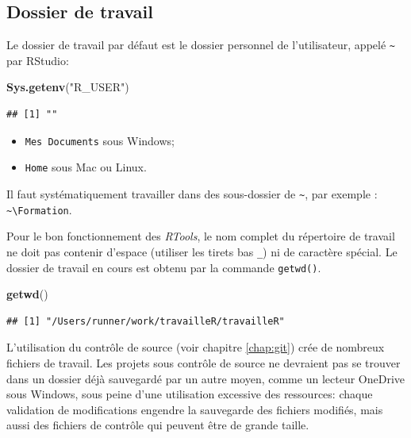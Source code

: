 \documentclass[
  12pt,
  french,
  a4paper,
  extrafontsizes,onecolumn,openright
  ]{memoir}
\newenvironment{Shaded}{\begin{snugshade}}{\end{snugshade}}
\newcommand{\KeywordTok}[1]{\textcolor[rgb]{0.13,0.29,0.53}{\textbf{#1}}}
\newcommand{\NormalTok}[1]{#1}
\newcommand{\StringTok}[1]{\textcolor[rgb]{0.31,0.60,0.02}{#1}}
\providecommand{\tightlist}{%
  \setlength{\itemsep}{0pt}\setlength{\parskip}{0pt}}
\begin{document}
\hypertarget{dossier-de-travail}{%
\subsection{Dossier de travail}\label{dossier-de-travail}}

Le dossier de travail par défaut est le dossier personnel de l'utilisateur, appelé \texttt{\textasciitilde{}} par RStudio:

\scriptsize

\begin{Shaded}
\begin{Highlighting}[]
\KeywordTok{Sys.getenv}\NormalTok{(}\StringTok{"R_USER"}\NormalTok{)}
\end{Highlighting}
\end{Shaded}

\begin{verbatim}
## [1] ""
\end{verbatim}

\normalsize

\begin{itemize}
\tightlist
\item
  \texttt{Mes\ Documents} sous Windows;
\item
  \texttt{Home} sous Mac ou Linux.
\end{itemize}

Il faut systématiquement travailler dans des sous-dossier de \texttt{\textasciitilde{}}, par exemple : \texttt{\textasciitilde{}\textbackslash{}Formation}.

Pour le bon fonctionnement des \emph{RTools}, le nom complet du répertoire de travail ne doit pas contenir d'espace (utiliser les tirets bas \texttt{\_}) ni de caractère spécial.
Le dossier de travail en cours est obtenu par la commande \texttt{getwd()}.

\scriptsize

\begin{Shaded}
\begin{Highlighting}[]
\KeywordTok{getwd}\NormalTok{()}
\end{Highlighting}
\end{Shaded}

\begin{verbatim}
## [1] "/Users/runner/work/travailleR/travailleR"
\end{verbatim}

\normalsize

L'utilisation du contrôle de source (voir chapitre \ref{chap:git}) crée de nombreux fichiers de travail.
Les projets sous contrôle de source ne devraient pas se trouver dans un dossier déjà sauvegardé par un autre moyen, comme un lecteur OneDrive sous Windows, sous peine d'une utilisation excessive des ressources: chaque validation de modifications engendre la sauvegarde des fichiers modifiés, mais aussi des fichiers de contrôle qui peuvent être de grande taille.
\end{document}
